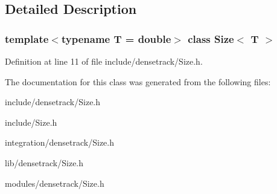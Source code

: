 \subsection{Detailed Description}
\subsubsection*{template$<$typename T = double$>$ class Size$<$ T $>$}



Definition at line 11 of file include/densetrack/Size.h.



The documentation for this class was generated from the following files:\begin{DoxyCompactItemize}
\item 
include/densetrack/Size.h\item 
include/Size.h\item 
integration/densetrack/Size.h\item 
lib/densetrack/Size.h\item 
modules/densetrack/Size.h\end{DoxyCompactItemize}
